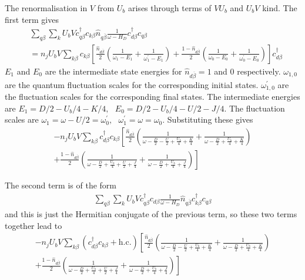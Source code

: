 \documentclass[reprint,superscriptaddress,floatfix]{revtex4-2}
\begin{document}
\begin{widetext}
The renormalisation in \(V\) from \(U_b\) arises through terms of \(V U_b\) and \(U_b V\) kind. The first term gives
\begin{equation}\begin{aligned}
	&\sum_{q\beta}\sum_{k}U_b V c^\dagger_{q\beta}c_{k\beta} \hat n_{q\overline\beta} \frac{1}{\omega - H_D} c^\dagger_{d\beta}c_{q\beta} \\
	&= n_jU_b V\sum_{k\beta} c_{k\beta} \left[\frac{\hat n_{d\overline\beta}}{2}\left(\frac{1}{\omega_1 - E_1} + \frac{1}{\omega^\prime_1 - E_1}\right) + \frac{1-\hat n_{d\overline\beta}}{2}\left(\frac{1}{\omega_0 - E_0} + \frac{1}{\omega_0^\prime - E_0}\right)\right] c^\dagger_{d\beta}
\end{aligned}\end{equation}
\(E_1\) and \(E_0\) are the intermediate state energies for \(\hat n_{d\overline\beta}=1\) and 0 respectively. \(\omega_{1,0}\) are the quantum fluctuation scales for the corresponding initial states. \(\omega^\prime_{1,0}\) are the fluctuation scales for the corresponding final states.
The intermediate energies are \(E_1 = D/2 - U_b/4 - K/4,~ ~ ~ E_0 = D/2 - U_b/4 - U/2 - J/4\). The fluctuation scales are \(\omega_1 = \omega - U/2= \omega_0^\prime,~ ~ ~ \omega_1^\prime = \omega = \omega_0\). Substituting these gives
\begin{equation}\begin{aligned}
	-n_jU_b V\sum_{k\beta} c^\dagger_{d\beta} c_{k\beta} \left[\frac{\hat n_{d\overline\beta}}{2}\left(\frac{1}{\omega - \frac{D}{2} - \frac{U}{2} + \frac{U_b}{4} + \frac{K}{4}} + \frac{1}{\omega - \frac{D}{2} + \frac{U_b}{4} + \frac{K}{4}}\right) \right.\\
+\left. \frac{1-\hat n_{d\overline\beta}}{2}\left(\frac{1}{\omega - \frac{D}{2} + \frac{U_b}{4} + \frac{U}{2} + \frac{J}{4}} + \frac{1}{\omega - \frac{D}{2} + \frac{U_b}{4} + \frac{J}{4}}\right)\right]
\end{aligned}\end{equation}

The second term is of the form
\begin{equation}\begin{aligned}
	\sum_{q\beta}\sum_{k}U_b V c^\dagger_{q\beta}c_{d\beta} \frac{1}{\omega - H_D} \hat n_{q\overline\beta} c^\dagger_{k\beta}c_{q\beta}
\end{aligned}\end{equation}
and this is just the Hermitian conjugate of the previous term, so these two terms together lead to
\begin{equation}\begin{aligned}
	-n_jU_b V\sum_{k\beta} \left(c^\dagger_{d\beta} c_{k\beta} + \text{h.c.}\right) \left[\frac{\hat n_{d\overline\beta}}{2}\left(\frac{1}{\omega - \frac{D}{2} - \frac{U}{2} + \frac{U_b}{4} + \frac{K}{4}} + \frac{1}{\omega - \frac{D}{2} + \frac{U_b}{4} + \frac{K}{4}}\right) \right.\\
	+ \left.\frac{1-\hat n_{d\overline\beta}}{2}\left(\frac{1}{\omega - \frac{D}{2} + \frac{U_b}{4} + \frac{U}{2} + \frac{J}{4}} + \frac{1}{\omega - \frac{D}{2} + \frac{U_b}{4} + \frac{J}{4}}\right)\right]
\end{aligned}\end{equation}


\end{widetext}
\end{document}
